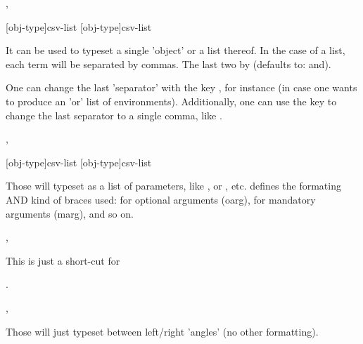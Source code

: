 \documentclass{article}
\begin{document}
\begin{codedescribe}[code]{\typesetobj,\tsobj}
\begin{codesyntax}
\tsmacro{\typesetobj}[obj-type]{csv-list}
\tsmacro{\tsobj}[obj-type]{csv-list}
\end{codesyntax}
It can be used to typeset a single 'object' or a list thereof. In the case of a list, each term will be separated by commas. The last two  by  (defaults to: and).
\end{codedescribe}
\begin{tsremark}
One can change the last 'separator' with the key , for instance \tsverb[code]{\tsobj[env,sep=or] {}} (in case one wants to produce an 'or' list of environments). Additionally, one can use the key  to change the last separator to a single comma, like .
\end{tsremark}

\begin{codedescribe}[code]{\typesetargs,\tsargs}
\begin{codesyntax}
\tsmacro{\typesetargs}[obj-type]{csv-list}
\tsmacro{\tsargs}[obj-type]{csv-list}
\end{codesyntax}
 Those will typeset  as a list of parameters, like , or , etc.  defines the formating AND kind of braces used: \tsverb{[]} for optional arguments (oarg), \tsverb{{}} for mandatory arguments (marg), and so on.
\end{codedescribe}


\begin{codedescribe}[code]{\typesetmacro,\tsmacro}
\begin{codesyntax}
\end{codesyntax}
This is just a short-cut for\par {}  .
\end{codedescribe}

\begin{codedescribe}[code]{\typesetmeta,\tsmeta}
\begin{codesyntax}
\end{codesyntax}
 Those will just typeset  between left/right 'angles' (no other formatting).
\end{codedescribe}
\end{document}
